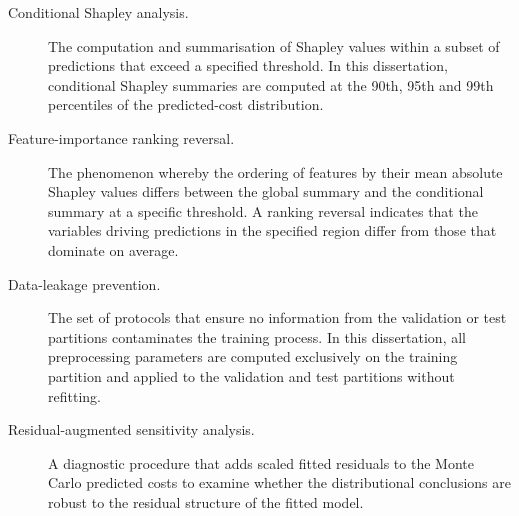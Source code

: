 \begin{description}
    \item[Conditional Shapley analysis.]  The computation and
          summarisation of Shapley values within a subset of predictions
          that exceed a specified threshold.  In this dissertation,
          conditional Shapley summaries are computed at the 90th, 95th
          and 99th percentiles of the predicted-cost distribution.

    \item[Feature-importance ranking reversal.]  The phenomenon whereby
          the ordering of features by their mean absolute Shapley values
          differs between the global summary and the conditional summary
          at a specific threshold.  A ranking reversal indicates that the
          variables driving predictions in the specified region differ
          from those that dominate on average.

    \item[Data-leakage prevention.]  The set of protocols that ensure no
          information from the validation or test partitions contaminates
          the training process.  In this dissertation, all preprocessing
          parameters are computed exclusively on the training partition
          and applied to the validation and test partitions without
          refitting.

    \item[Residual-augmented sensitivity analysis.]  A diagnostic
          procedure that adds scaled fitted residuals to the Monte Carlo
          predicted costs to examine whether the distributional
          conclusions are robust to the residual structure of the fitted
          model.
\end{description}
